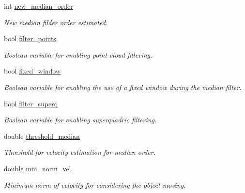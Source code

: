 \begin{DoxyCompactItemize}
\mbox{\label{classSuperqComputation_a716b1dadab06327d2e151235a1d8473d}} 
int \mbox{\hyperlink{classSuperqComputation_a716b1dadab06327d2e151235a1d8473d}{new\+\_\+median\+\_\+order}}
\begin{DoxyCompactList}\small\item\em New median filder order estimated. \end{DoxyCompactList}\item 
\mbox{\label{classSuperqComputation_a7ba8919ab91d4209eae8ab7484127d95}} 
bool \mbox{\hyperlink{classSuperqComputation_a7ba8919ab91d4209eae8ab7484127d95}{filter\+\_\+points}}
\begin{DoxyCompactList}\small\item\em Boolean variable for enabling point cloud filtering. \end{DoxyCompactList}\item 
\mbox{\label{classSuperqComputation_a05c6cb1a1018d9ef2327ef69a12a8c98}} 
bool \mbox{\hyperlink{classSuperqComputation_a05c6cb1a1018d9ef2327ef69a12a8c98}{fixed\+\_\+window}}
\begin{DoxyCompactList}\small\item\em Boolean variable for enabling the use of a fixed window during the median filter. \end{DoxyCompactList}\item 
\mbox{\label{classSuperqComputation_a5ff0b2908d2bb2399a4048f55fb295a1}} 
bool \mbox{\hyperlink{classSuperqComputation_a5ff0b2908d2bb2399a4048f55fb295a1}{filter\+\_\+superq}}
\begin{DoxyCompactList}\small\item\em Boolean variable for enabling superquadric filtering. \end{DoxyCompactList}\item 
\mbox{\label{classSuperqComputation_a99ff3b4952560a7b687512361c2d06f4}} 
double \mbox{\hyperlink{classSuperqComputation_a99ff3b4952560a7b687512361c2d06f4}{threshold\+\_\+median}}
\begin{DoxyCompactList}\small\item\em Threshold for velocity estimation for median order. \end{DoxyCompactList}\item 
\mbox{\label{classSuperqComputation_a56c1d0c3110650d5f609c36fbf26253b}} 
double \mbox{\hyperlink{classSuperqComputation_a56c1d0c3110650d5f609c36fbf26253b}{min\+\_\+norm\+\_\+vel}}
\begin{DoxyCompactList}\small\item\em Minimum norm of velocity for considering the object moving. \end{DoxyCompactList}\item 

\end{DoxyCompactItemize}
